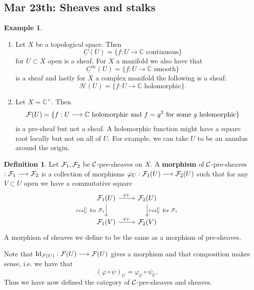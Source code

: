 \documentclass[11pt]{article}
\theoremstyle{definition}
\newtheorem{dfn}[thm]{Definition}
\newtheorem{ex}[thm]{Example}
\newcommand{\cplx}{\mathbb C}
\newcommand{\calf}{{\cal F}}
\newcommand{\calc}{{\cal C}}
\begin{document}
\subsection{Mar 23th: Sheaves and stalks}
\begin{ex}
    \begin{enumerate}[label=(\arabic*)]
        \item 
        Let $X$ be a topological space. Then
        $$
            \underline C(U) = \{ f : U \longrightarrow \mathbb C \text{ continuous}\}
        $$
        for $U\subset X$ open is a sheaf. For $X$ a manifold we also have that
        $$
        \underline C^\infty(U) = \{ f : U \longrightarrow \mathbb C \text{ smooth}\}
        $$
        is a sheaf and lastly for $X$ a complex manifold the following is a sheaf:
        $$
        \mathcal H(U) = \{ f : U \longrightarrow \cplx \text{ holomorphic}\}. 
        $$
        \item
        Let $X= \mathbb C^\times$. Then
        $$
        \calf(U) = \{f: U \longrightarrow \mathbb C \text{ holomorphic and } f= g^2 \text{ for some $g$ holomorphic} \}
        $$
        is a pre-sheaf but not a sheaf. A holomorphic function might have a square root locally but not on all of $U$. For example, we can take $U$ to be an annulus around the origin.
    \end{enumerate}
\end{ex}

\begin{dfn}
    Let $\calf_1, \calf_2$ be $\calc$-pre-sheaves on $X$. A \textbf{morphism} of $\calc$-pre-sheaves $ : \calf_1 \longrightarrow \calf_2$ is a collection of morphisms $\varphi_U: \calf_1(U) \longrightarrow \calf_2(U)$ such that for any $V\subset U$ open we have a commutative square
    $$
    \begin{tikzcd}
    \calf_1(U) \arrow[r, "\varphi_U"] \arrow[d, "res^U_V \text{ for } \calf_1"'] & \calf_2(U) \arrow[d, "res^U_V \text{ for } \calf_1"] \\
    \calf_1(V) \arrow[r, "\varphi_V"] & \calf_2(V)
    \end{tikzcd}
    $$
    A morphism of sheaves we define to be the same as a morphism of pre-sheaves.
\end{dfn}
Note that $\operatorname{Id}_{\calf(U)}: \calf(U) \longrightarrow \calf(U)$ gives a morphism and that composition makes sense, i.e. we have that
$$
(\varphi \circ \psi)_U = \varphi_U \circ \psi_U.
$$ 
Thus we have now defined the category of $\calc$-pre-sheaves and sheaves.
\end{document}
